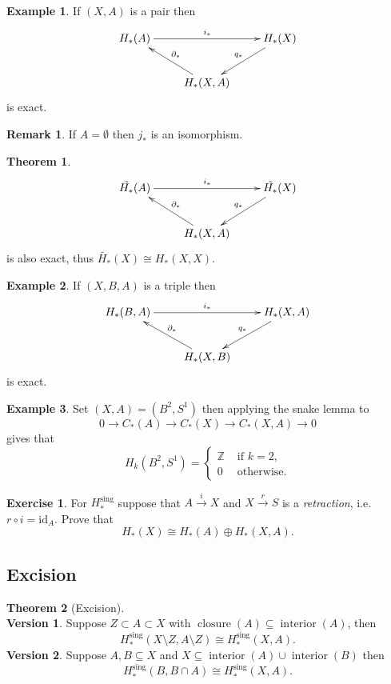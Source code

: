 \documentclass[12pt]{article}
\theoremstyle{definition}
\newtheorem*{thm}{Theorem}
\theoremstyle{definition}
\newtheorem*{ex}{Example}
\newtheorem*{exer}{Exercise}
\newtheorem*{rmk}{Remark}
\newcommand{\ZZ}{\mathbb{Z}}
\newcommand{\C}{C_*}
\renewcommand{\H}{H_*}
\begin{document}
\begin{ex}
If $(X,A)$ is a pair then 
\[
\xymatrix
{
 \H(A) \ar[rr]^{i_*}& &\H(X)\ar[dl]_{q_*} \\
 &\H(X,A) \ar[ul]_{\partial_*}&
}
\]
is exact.
\end{ex}

\begin{rmk}
If $A = \emptyset$ then $j_*$ is an isomorphism.
\end{rmk}

\begin{thm}
\[
\xymatrix
{
 \tilde{\H}(A) \ar[rr]^{i_*}& &\tilde{\H}(X)\ar[dl]_{q_*} \\
 &\H(X,A) \ar[ul]_{\partial_*}&
}
\]
is also exact, thus $\tilde{\H}(X) \cong \H(X,X)$.
\end{thm}

\begin{ex}
If $(X,B,A)$ is a triple then
\[
\xymatrix
{
 \H(B,A) \ar[rr]^{i_*}& &\H(X,A)\ar[dl]_{q_*} \\
 &\H(X,B) \ar[ul]_{\partial_*}&
}
\]
is exact.
\end{ex}

\begin{ex}
Set $(X,A) = (B^2, S^1)$ then applying the snake lemma to
\[
0 \to \C(A) \to \C(X)\to \C(X,A) \to 0
\]
gives that
\[
H_k(B^2, S^1) =\begin{cases}\ZZ&\text{ if }k=2,\\
0 &\text{ otherwise}.
\end{cases} 
\]
\end{ex}

\begin{exer}
For $\H^\text{sing}$ suppose that $A\xrightarrow{i} X$ and $X\xrightarrow{r} S$ is a \emph{retraction}, i.e. $r\circ i = \mathrm{id}_A$.
Prove that
\[
\H(X) \cong\H(A) \oplus \H(X,A).
\]
\end{exer}

\subsection{Excision}

\begin{thm}[Excision]~\\
\textbf{Version 1}.
Suppose $Z\subset A \subset X$ with $\operatorname{closure}(A) \subseteq \operatorname{interior}(A)$, then
\[
\H^\text{sing}(X\setminus Z, A\setminus Z) \cong \H^\text{sing}(X, A).
\]
\textbf{Version 2}.
Suppose $A,B\subseteq X$ and $X \subseteq \operatorname{interior}(A) \cup \operatorname{interior}(B)$ then 
\[
\H^\text{sing}(B, B\cap A) \cong \H^\text{sing}(X, A).
\]
\end{thm}
\end{document}

